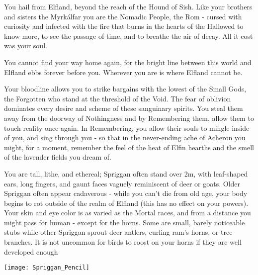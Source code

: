 

  
  You hail from Elfland, beyond the reach of the Hound of Sish.  Like your brothers and sisters the Myrkálfar you are the Nomadic People, the Rom - cursed with curiosity and infected with the fire that burns in the hearts of the Hallowed to know more, to see the passage of time, and to breathe the air of decay.  All it cost was your soul.  

  You cannot find your way home again, for the bright line between this world and Elfland ebbs forever before you.  Wherever you are is where Elfland cannot be.

  Your bloodline allows you to strike bargains with the lowest of the Small Gods, the Forgotten who stand at the threshold of the Void.  The fear of oblivion dominates every desire and scheme of these sanguinary spirits.  You steal them away from the doorway of Nothingness and by Remembering them, allow them to touch reality once again.  In Remembering, you allow their souls to mingle inside of you, and sing through you - so that in the never-ending ache of Acheron you might, for a moment, remember the feel of the heat of Elfin hearths and the smell of the lavender fields you dream of.  

  You are tall, lithe, and ethereal; Spriggan often stand over 2m, with leaf-shaped ears, long fingers, and gaunt faces vaguely reminiscent of deer or goats.  Older Spriggan often appear cadaverous - while you can't die from old age, your body begins to rot outside of the realm of Elfland (this has no effect on your powers).  Your skin and eye color is as varied as the Mortal races, and from a distance you might pass for human - except for the horns.  Some are small, barely noticeable stubs while other Spriggan sprout deer antlers, curling ram's horns, or tree branches.  It is not uncommon for birds to roost on your horns if they are well developed enough 

    \begin{center}
      \texttt{[image: Spriggan\_Pencil]}
    \end{center}


